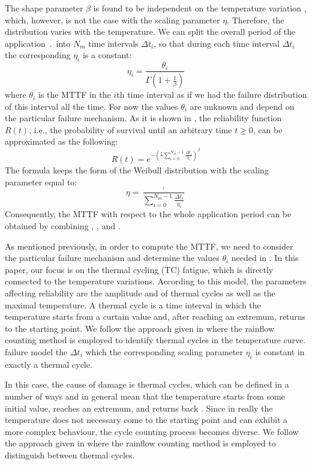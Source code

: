The shape parameter $\beta$ is found to be independent on the temperature variation \cite{chang2006}, which, however, is not the case with the scaling parameter $\eta$. Therefore, the distribution varies with the temperature. We can split the overall period of the application $\period$ into $N_m$ time intervals $\Delta t_i$, so that during each time interval $\Delta t_i$ the corresponding $\eta_i$ is a constant:
\begin{equation} \label{eq:eta-one}
  \eta_i = \frac{\theta_i}{\Gamma(1 + \frac{1}{\beta})}
\end{equation}
where $\theta_i$ is the MTTF in the $i$th time interval as if we had the failure distribution of this interval all the time. For now the values $\theta_i$ are unknown and depend on the particular failure mechanism. As it is shown in \cite{xiang2010}, the reliability function $R(t)$, i.e., the probability of survival until an arbitrary time $t \geq 0$, can be approximated as the following:
\[
  R(t) = e^{-(\frac{t}{\period} \sum_{i=0}^{N_m - 1} \frac{\Delta t_i}{\eta_i})^\beta}
\]
The formula keeps the form of the Weibull distribution with the scaling parameter equal to:
\begin{equation} \label{eq:eta-many}
  \eta = \frac{\period}{\sum_{i=0}^{N_m - 1} \frac{\Delta t_i}{\eta_i}}
\end{equation}
Consequently, the MTTF with respect to the whole application period can be obtained by combining , , and .

As mentioned previously, in order to compute the MTTF, we need to consider the particular failure mechanism and determine the values $\theta_i$ needed in . In this paper, our focus is on the thermal cycling (TC) fatigue, which is directly connected to the temperature variations. According to this model, the parameters affecting reliability are the amplitude and  of thermal cycles as well as the maximal temperature. A thermal cycle is a time interval in which the temperature starts from a curtain value and, after reaching an extremum, returns  to the starting point. We follow the approach given in \cite{xiang2010} where the rainflow counting method is employed to identify thermal cycles in the temperature curve.  failure model the  $\Delta t_i$  which the corresponding scaling parameter $\eta_i$ is constant  in exactly a thermal cycle.

In this case, the cause of damage is thermal cycles, which can be defined in a number of ways \cite{ciappa2003} and in general mean that the temperature starts from some initial value, reaches an extremum, and returns back \cite{xiang2010}. Since in really the temperature does not necessary come to the starting point and can exhibit a more complex behaviour, the cycle counting process becomes diverse. We follow the approach given in \cite{xiang2010} where the rainflow counting method is employed to distinguish between thermal cycles.

